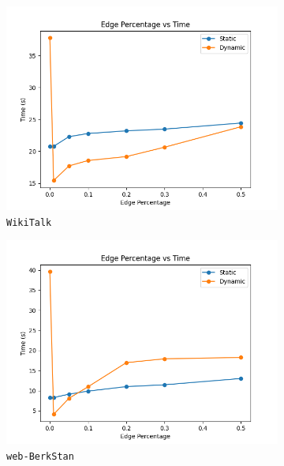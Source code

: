 \begin{figure}[h!]
    \begin{subfigure}{0.3\textwidth}
        \centering
        \includegraphics[width=\linewidth]{./Figures/WikiTalk.out.png}
        \caption{\texttt{WikiTalk}}
    \end{subfigure}
    \hfill
    \begin{subfigure}{0.3\textwidth}
        \centering
        \includegraphics[width=\linewidth]{./Figures/web-BerkStan.out.png}
        \caption{\texttt{web-BerkStan}}
    \end{subfigure}
    \hfill
    \begin{subfigure}{0.3\textwidth}
        \centering

\end{subfigure}
\end{figure}
